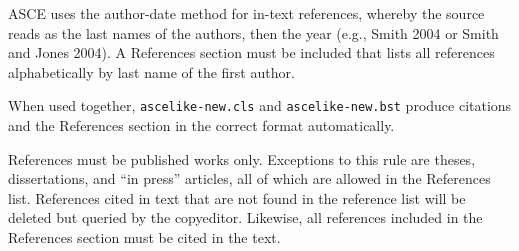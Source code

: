 \documentclass[Journal,letterpaper,NoLineNumbers]{ascelike-new}
\begin{document}
ASCE uses the author-date method for in-text references, whereby the source reads as the last names of the authors, then the year (e.g., Smith 2004 or Smith and Jones 2004). A References section must be included that lists all references alphabetically by last name of the first author. 

When used together, \texttt{ascelike-new.cls} and \texttt{ascelike-new.bst} produce citations and the References section in the correct format automatically.

References must be published works only. Exceptions to this rule are theses, dissertations, and ``in press'' articles, all of which are allowed in the References list. References cited in text that are not found in the reference list will be deleted but queried by the copyeditor. Likewise, all references included in the References section must be cited in the text.
\end{document}
